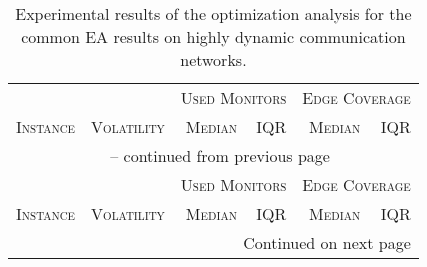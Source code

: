 \documentclass{scrartcl}
\begin{document}
\begin{center}
\begin{longtable}{lrrrrr}
    \caption{Experimental results of the optimization analysis for the common EA results on highly dynamic communication networks.}\\
    \toprule
    & \textsc{} & \multicolumn{2}{c}{\textsc{Used Monitors}} & \multicolumn{2}{c}{\textsc{Edge Coverage}} \\
        \textsc{Instance} & \textsc{Volatility} & \textsc{Median} & \textsc{IQR} & \textsc{Median} & \textsc{IQR}\\
    \midrule
    \endfirsthead
    
    \multicolumn{6}{c}{\tablename~\thetable{} -- continued from previous page}\\
    & \textsc{} & \multicolumn{2}{c}{\textsc{Used Monitors}} & \multicolumn{2}{c}{\textsc{Edge Coverage}} \\
        \textsc{Instance} & \textsc{Volatility} & \textsc{Median} & \textsc{IQR} & \textsc{Median} & \textsc{IQR}\\
    \midrule
    \endhead
    
    \midrule
    \multicolumn{6}{r}{Continued on next page}
    \endfoot
    \bottomrule
    \endlastfoot
    

\end{longtable}
\end{center}
\end{document}
